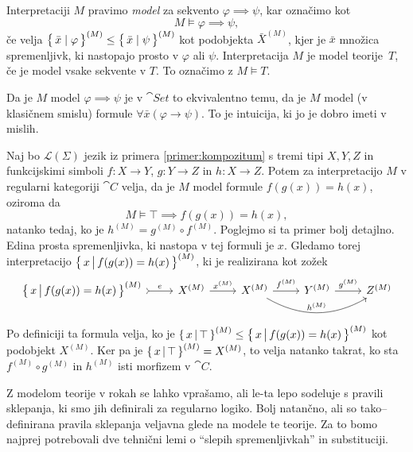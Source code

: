 \documentclass[../kategoricna_logika.tex]{subfiles}
\begin{document}
\begin{definicija}
  Interpretaciji $M$ pravimo \emph{model} za sekvento $\varphi \implies \psi$, kar označimo kot
  $$M \models \varphi \implies \psi,$$
  če velja $\left\lbrace\,\bar{x} \mid \varphi\,\right\rbrace^{(M)} \leq \left\lbrace\,\bar{x} \mid \psi\,\right\rbrace^{(M)}$
  kot podobjekta $\bar{X}^{(M)}$, kjer je $\bar{x}$ množica spremenljivk,
  ki nastopajo prosto v $\varphi$ ali $\psi$.
  Interpretacija $M$ je model teorije~$T$, če je model vsake sekvente v $T$.
  To označimo z $M \models T$.
\end{definicija}
\begin{opomba}
Da je $M$ model $\varphi \implies \psi$ je v $\cat{Set}$ to ekvivalentno temu, da je $M$ model (v klasičnem smislu) formule $\forall \bar{x} (\varphi \rightarrow \psi)$. To je intuicija, ki jo je dobro imeti v mislih.
\end{opomba}
\begin{primer}
  Naj bo $\mathcal{L}(\Sigma)$ jezik iz primera \ref{primer:kompozitum} s tremi tipi $X,Y,Z$
  in funkcijskimi simboli $f : X \to Y$, $g : Y \to Z$ in $h : X \to Z$.
  Potem za interpretacijo $M$ v regularni kategoriji $\cat{C}$ velja,
  da je $M$ model formule $f(g(x)) = h(x)$, oziroma da
  $$M \models \top \implies f(g(x)) = h(x),$$ 
  natanko tedaj, ko je $h^{(M)} = g^{(M)} \circ f^{(M)}$.
  Poglejmo si ta primer bolj detajlno.
  Edina prosta spremenljivka, ki nastopa v tej formuli je $x$. Gledamo torej interpretacijo
  $\left\lbrace\,x \,\middle|\, f(g(x)) = h(x)\,\right\rbrace^{(M)}$, ki je realizirana kot zožek 
  \begin{equation*}
    \begin{tikzcd}[column sep=normal]
      \set{x \,\middle|\, f(g(x)) = h(x)}^{(M)} \ar[r, tail, "e"] & X^{(M)} \ar[r, "x^{(M)}"] & X^{(M)} \ar[r, "f^{(M)}"] \ar[rr, bend right, "h^{(M)}"] & Y^{(M)} \ar[r, "g^{(M)}"] & Z^{(M)}
    \end{tikzcd}
  \end{equation*}
  Po definiciji ta formula velja, ko je
  $\left\lbrace\,x \,\middle|\, \top\,\right\rbrace^{(M)} \leq \left\lbrace\,x \,\middle|\, f(g(x)) = h(x)\,\right\rbrace^{(M)}$
  kot podobjekt $X^{(M)}$.
  Ker pa je $\left\lbrace\,x \,\middle|\, \top\,\right\rbrace^{(M)} = X^{(M)}$,
  to velja natanko takrat, ko sta $f^{(M)} \circ g^{(M)}$ in $h^{(M)}$ isti morfizem v $\cat{C}$.
\end{primer}
Z modelom teorije v rokah se lahko vprašamo, ali le-ta lepo sodeluje s pravili sklepanja,
ki smo jih definirali za regularno logiko.
Bolj natančno, ali so tako--definirana pravila sklepanja veljavna glede na modele te teorije.
Za to bomo najprej potrebovali dve tehnični lemi o ``slepih spremenljivkah'' in substituciji.
\end{document}
